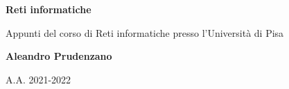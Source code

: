\begin{titlepage}
    \begin{center}
        \vspace*{1cm}

        \huge
        \textbf{Reti informatiche}

        \vspace{0.5cm}

        Appunti del corso di Reti informatiche presso l'Università di Pisa

        \vspace{1.5cm}

        \textbf{Aleandro Prudenzano}

        \vfill
        \vspace{0.8cm}

        A.A. 2021-2022

    \end{center}
\end{titlepage}

\clearpage
\begingroup
  \pagestyle{empty}
  \null
  \newpage
\endgroup

\renewcommand{\contentsname}{Indice}
\tableofcontents

\clearpage
\begingroup
  \pagestyle{empty}
  \null
  \newpage
\endgroup